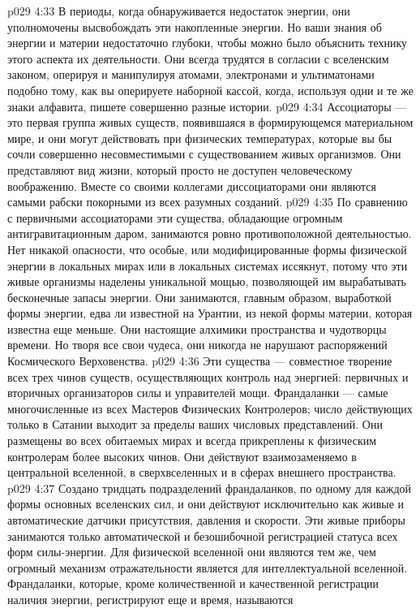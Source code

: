 \vs p029 4:33 В периоды, когда обнаруживается недостаток энергии, они уполномочены высвобождать эти накопленные энергии. Но ваши знания об энергии и материи недостаточно глубоки, чтобы можно было объяснить технику этого аспекта их деятельности. Они всегда трудятся в согласии с вселенским законом, оперируя и манипулируя атомами, электронами и ультиматонами подобно тому, как вы оперируете наборной кассой, когда, используя одни и те же знаки алфавита, пишете совершенно разные истории.
\vs p029 4:34 Ассоциаторы --- это первая группа живых существ, появившаяся в формирующемся материальном мире, и они могут действовать при физических температурах, которые вы бы сочли совершенно несовместимыми с существованием живых организмов. Они представляют вид жизни, который просто не доступен человеческому воображению. Вместе со своими коллегами диссоциаторами они являются самыми рабски покорными из всех разумных созданий.
\vs p029 4:35 \bibnobreakspace {} По сравнению с первичными ассоциаторами эти существа, обладающие огромным антигравитационным даром, занимаются ровно противоположной деятельностью. Нет никакой опасности, что особые, или модифицированные формы физической энергии в локальных мирах или в локальных системах иссякнут, потому что эти живые организмы наделены уникальной мощью, позволяющей им вырабатывать бесконечные запасы энергии. Они занимаются, главным образом, выработкой формы энергии, едва ли известной на Урантии, из некой формы материи, которая известна еще меньше. Они настоящие алхимики пространства и чудотворцы времени. Но творя все свои чудеса, они никогда не нарушают распоряжений Космического Верховенства.
\vs p029 4:36 \bibnobreakspace {} Эти существа --- совместное творение всех трех чинов существ, осуществляющих контроль над энергией: первичных и вторичных организаторов силы и управителей мощи. Франдаланки --- самые многочисленные из всех Мастеров Физических Контролеров; число действующих только в Сатании выходит за пределы ваших числовых представлений. Они размещены во всех обитаемых мирах и всегда прикреплены к физическим контролерам более высоких чинов. Они действуют взаимозаменяемо в центральной вселенной, в сверхвселенных и в сферах внешнего пространства.
\vs p029 4:37 Создано тридцать подразделений франдаланков, по одному для каждой формы основных вселенских сил, и они действуют исключительно как живые и автоматические датчики присутствия, давления и скорости. Эти живые приборы занимаются только автоматической и безошибочной регистрацией статуса всех форм силы\hyp{}энергии. Для физической вселенной они являются тем же, чем огромный механизм отражательности является для интеллектуальной вселенной. Франдаланки, которые, кроме количественной и качественной регистрации наличия энергии, регистрируют еще и время, называются 

